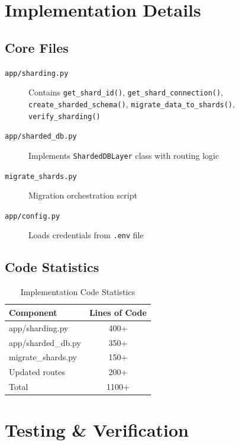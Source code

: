 \documentclass[12pt,a4paper]{article}
\begin{document}
\section{Implementation Details}

\subsection{Core Files}

\begin{description}
    \item[\texttt{app/sharding.py}] Contains \texttt{get\_shard\_id()}, \texttt{get\_shard\_connection()}, \texttt{create\_sharded\_schema()}, \texttt{migrate\_data\_to\_shards()}, \texttt{verify\_sharding()}
    \item[\texttt{app/sharded\_db.py}] Implements \texttt{ShardedDBLayer} class with routing logic
    \item[\texttt{migrate\_shards.py}] Migration orchestration script
    \item[\texttt{app/config.py}] Loads credentials from \texttt{.env} file
\end{description}

\subsection{Code Statistics}

\begin{table}[H]
\centering
\begin{tabularx}{\textwidth}{|l|c|}
\hline
\textbf{Component} & \textbf{Lines of Code} \\
\hline
app/sharding.py & 400+ \\
app/sharded\_db.py & 350+ \\
migrate\_shards.py & 150+ \\
Updated routes & 200+ \\
\hline
Total & 1100+ \\
\hline
\end{tabularx}
\caption{Implementation Code Statistics}
\end{table}

\section{Testing \& Verification}
\end{document}
